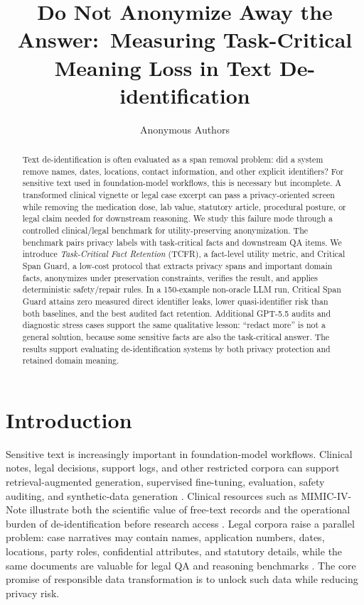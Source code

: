 \documentclass{article}
\title{Do Not Anonymize Away the Answer:\
Measuring Task-Critical Meaning Loss in Text De-identification}
\author{Anonymous Authors}
\date{}
\newcommand{\method}{Critical Span Guard}
\newcommand{\tcfr}{TCFR}
\begin{document}
\ifcolmsubmission
\linenumbers
\fi

\maketitle

\begin{abstract}
Text de-identification is often evaluated as a span removal problem: did a
system remove names, dates, locations, contact information, and other explicit
identifiers?  For sensitive text used in foundation-model workflows, this is
necessary but incomplete.  A transformed clinical vignette or legal case excerpt
can pass a privacy-oriented screen while removing the medication dose, lab value,
statutory article, procedural posture, or legal claim needed for downstream
reasoning.  We study this failure mode through a controlled clinical/legal
benchmark for utility-preserving anonymization.  The benchmark pairs privacy
labels with task-critical facts and downstream QA items.  We introduce
\textit{Task-Critical Fact Retention} (\tcfr), a fact-level utility metric, and
\method, a low-cost protocol that extracts privacy spans and important domain
facts, anonymizes under preservation constraints, verifies the result, and
applies deterministic safety/repair rules.  In a 150-example non-oracle LLM run,
\method{} attains zero measured direct identifier leaks, lower quasi-identifier
risk than both baselines, and the best audited fact retention.  Additional
GPT-5.5 audits and diagnostic stress cases support the same qualitative lesson:
``redact more'' is not a general solution, because some sensitive facts are also
the task-critical answer.  The results support evaluating de-identification
systems by both privacy protection and retained domain meaning.
\end{abstract}

\section{Introduction}

Sensitive text is increasingly important in foundation-model workflows.  Clinical
notes, legal decisions, support logs, and other restricted corpora can support
retrieval-augmented generation, supervised fine-tuning, evaluation, safety
auditing, and synthetic-data generation \cite{bommasani2021foundation,lewis2020rag}.
Clinical resources such as MIMIC-IV-Note illustrate both the scientific value of
free-text records and the operational burden of de-identification before
research access \cite{johnson2023mimicnote}.  Legal corpora raise a parallel
problem: case narratives may contain names, application numbers, dates,
locations, party roles, confidential attributes, and statutory details, while the
same documents are valuable for legal QA and reasoning benchmarks
\cite{pilan2022tab}.  The core promise of responsible data transformation is to
unlock such data while reducing privacy risk.
\end{document}
